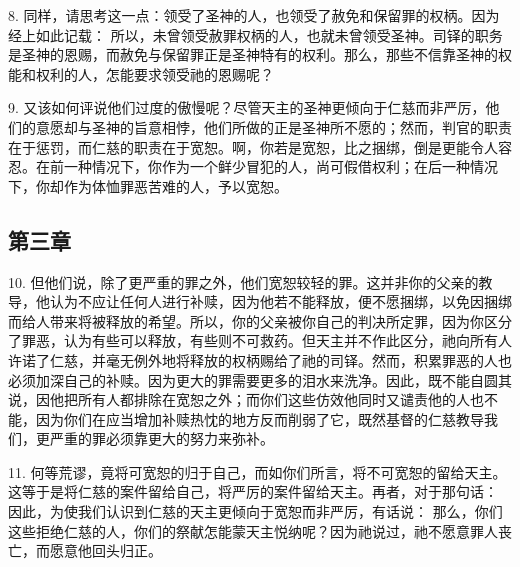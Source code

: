 8. 同样，请思考这一点：领受了圣神的人，也领受了赦免和保留罪的权柄。因为经上如此记载： 所以，未曾领受赦罪权柄的人，也就未曾领受圣神。司铎的职务是圣神的恩赐，而赦免与保留罪正是圣神特有的权利。那么，那些不信靠圣神的权能和权利的人，怎能要求领受祂的恩赐呢？\par

9. 又该如何评说他们过度的傲慢呢？尽管天主的圣神更倾向于仁慈而非严厉，他们的意愿却与圣神的旨意相悖，他们所做的正是圣神所不愿的；然而，判官的职责在于惩罚，而仁慈的职责在于宽恕。啊，你若是宽恕，比之捆绑，倒是更能令人容忍。在前一种情况下，你作为一个鲜少冒犯的人，尚可假借权利；在后一种情况下，你却作为体恤罪恶苦难的人，予以宽恕。\par


\subsection{第三章}

\par

10. 但他们说，除了更严重的罪之外，他们宽恕较轻的罪。这并非你的父亲的教导，他认为不应让任何人进行补赎，因为他若不能释放，便不愿捆绑，以免因捆绑而给人带来将被释放的希望。所以，你的父亲被你自己的判决所定罪，因为你区分了罪恶，认为有些可以释放，有些则不可救药。但天主并不作此区分，祂向所有人许诺了仁慈，并毫无例外地将释放的权柄赐给了祂的司铎。然而，积累罪恶的人也必须加深自己的补赎。因为更大的罪需要更多的泪水来洗净。因此，既不能自圆其说，因他把所有人都排除在宽恕之外；而你们这些仿效他同时又谴责他的人也不能，因为你们在应当增加补赎热忱的地方反而削弱了它，既然基督的仁慈教导我们，更严重的罪必须靠更大的努力来弥补。\par

11. 何等荒谬，竟将可宽恕的归于自己，而如你们所言，将不可宽恕的留给天主。这等于是将仁慈的案件留给自己，将严厉的案件留给天主。再者，对于那句话： 因此，为使我们认识到仁慈的天主更倾向于宽恕而非严厉，有话说： 那么，你们这些拒绝仁慈的人，你们的祭献怎能蒙天主悦纳呢？因为祂说过，祂不愿意罪人丧亡，而愿意他回头归正。\par

